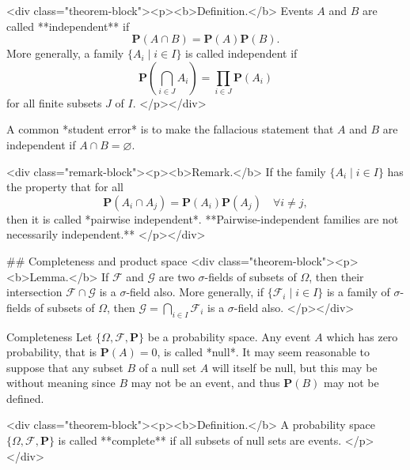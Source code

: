 <div class="theorem-block"><p><b>Definition.</b> 
Events $A$ and $B$ are called **independent** if 
$$\begin{equation}
    \mathbf{P}(A \cap B) = \mathbf{P}(A) \mathbf{P}(B).
\end{equation}$$
More generally, a family $\{A_i \;\vert\; i \in I\}$ is called independent if
$$\begin{equation}
    \mathbf{P} \left( \bigcap_{i \in J} A_i \right) = \prod_{i\in J} \mathbf{P}(A_i)
\end{equation}$$
for all finite subsets $J$ of $I$. 
</p></div>

\begin{caution}
A common *student error* is to make the fallacious statement that $A$ and $B$ are independent if $A \cap B = \varnothing$.
\end{caution}

<div class="remark-block"><p><b>Remark.</b> 
If the family $\{A_i \;\vert\; i \in I\}$ has the property that 
for all 
$$\begin{equation}
    \mathbf{P}(A_i \cap A_j) = \mathbf{P}(A_i) \mathbf{P}(A_j) \quad \forall i\neq j, 
\end{equation}$$
then it is called *pairwise independent*. **Pairwise-independent families are not necessarily independent.** 
</p></div>

## Completeness and product space
<div class="theorem-block"><p><b>Lemma.</b> 
If $\mathcal{F}$ and $\mathcal{G}$ are two $\sigma$-fields of subsets of $\Omega$, then their intersection $\mathcal{F} \cap \mathcal{G}$ is a $\sigma$-field also. More generally, if $\{ \mathcal{F}_i \;\vert\;  i \in I \}$ is a family of $\sigma$-fields of subsets of $\Omega$, then $\mathcal{G} = \bigcap_{i\in I} \mathcal{F}_i $ is a $\sigma$-field also. 
</p></div>

\begin{newnotion}{Completeness}
Let $\{\Omega, \mathcal{F}, \mathbf{P}\}$ be a probability space. Any event $A$ which has zero probability, that is $\mathbf{P}(A) = 0$, is called *null*. It may seem reasonable to suppose that any subset $B$ of a null set $A$ will itself be null, but this may be without meaning since $B$ may not be an event, and thus $\mathbf{P}(B)$ may not be defined. 
\end{newnotion}

<div class="theorem-block"><p><b>Definition.</b> 
A probability space $\{\Omega, \mathcal{F}, \mathbf{P}\}$ is called **complete** if all subsets of null sets are events. 
</p></div>

